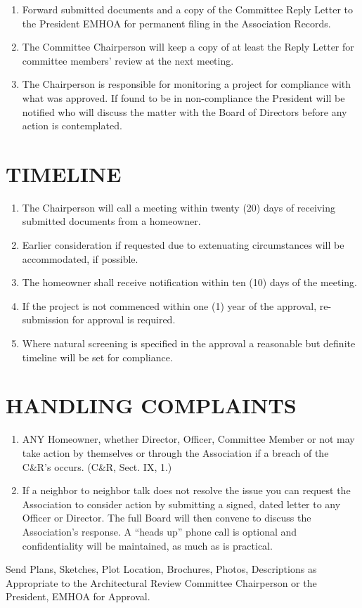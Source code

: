 \documentclass[10pt, letterpaper]{article}
\begin{document}
\begin{enumerate}
  \item Forward submitted documents and a copy of the Committee Reply Letter to the President EMHOA for permanent filing in the Association Records.
  \item The Committee Chairperson will keep a copy of at least the Reply Letter for committee members' review at the next meeting.
  \item The Chairperson is responsible for monitoring a project for compliance with what was approved.
    If found to be in non-compliance the President will be notified who will discuss the matter with the Board of Directors before any action is contemplated.
\end{enumerate}

\section{TIMELINE}
\begin{enumerate}
  \item The Chairperson will call a meeting within twenty (20) days of receiving submitted documents from a homeowner.
  \item Earlier consideration if requested due to extenuating circumstances will be accommodated, if possible.
  \item The homeowner shall receive notification within ten (10) days of the meeting.
  \item If the project is not commenced within one (1) year of the approval, re-submission for approval is required.
  \item Where natural screening is specified in the approval a reasonable but definite timeline will be set for compliance.
\end{enumerate}

\section{HANDLING COMPLAINTS}
\begin{enumerate}
  \item ANY Homeowner, whether Director, Officer, Committee Member or not may take action by themselves or through the Association if a breach of the C\&R's occurs.
    \hfill (C\&R, Sect. IX, 1.)
  \item If a neighbor to neighbor talk does not resolve the issue you can request the Association to consider action by submitting a signed, dated letter to any Officer or Director.
    The full Board will then convene to discuss the Association's response.
    A ``heads up'' phone call is optional and confidentiality will be maintained, as much as is practical.
\end{enumerate}

Send Plans, Sketches, Plot Location, Brochures, Photos, Descriptions as Appropriate to the Architectural Review Committee Chairperson or the President, EMHOA for Approval.
\end{document}
